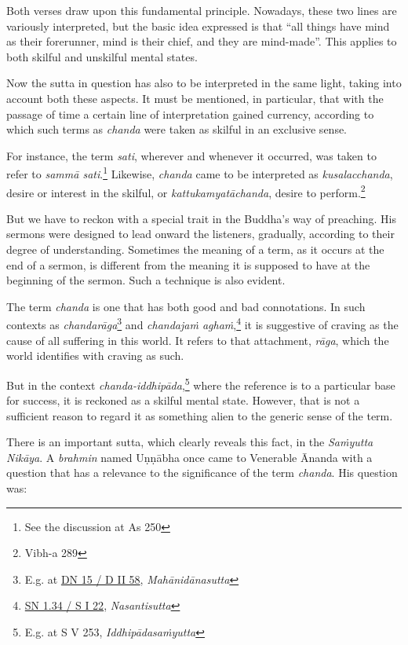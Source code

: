 Both verses draw upon this fundamental principle. Nowadays, these two lines are variously interpreted, but the basic idea expressed is that ``all things have mind as their forerunner, mind is their chief, and they are mind-made''. This applies to both skilful and unskilful mental states.

Now the sutta in question has also to be interpreted in the same light, taking into account both these aspects. It must be mentioned, in particular, that with the passage of time a certain line of interpretation gained currency, according to which such terms as \emph{chanda} were taken as skilful in an exclusive sense.

For instance, the term \emph{sati}, wherever and whenever it occurred, was taken to refer to \emph{sammā sati}.\footnote{See the discussion at As 250} Likewise, \emph{chanda} came to be interpreted as \emph{kusalacchanda}, desire or interest in the skilful, or \emph{kattukamyatāchanda}, desire to perform.\footnote{Vibh-a 289}

But we have to reckon with a special trait in the Buddha's way of preaching. His sermons were designed to lead onward the listeners, gradually, according to their degree of understanding. Sometimes the meaning of a term, as it occurs at the end of a sermon, is different from the meaning it is supposed to have at the beginning of the sermon. Such a technique is also evident.

The term \emph{chanda} is one that has both good and bad connotations. In such contexts as \emph{chandarāga}\footnote{E.g. at \href{https://suttacentral.net/dn15/pli/ms}{DN 15 / D II 58}, \emph{Mahānidānasutta}} and \emph{chandajaṁ aghaṁ},\footnote{\href{https://suttacentral.net/sn1.34/pli/ms}{SN 1.34 / S I 22}, \emph{Nasantisutta}} it is suggestive of craving as the cause of all suffering in this world. It refers to that attachment, \emph{rāga}, which the world identifies with craving as such.

But in the context \emph{chanda-iddhipāda},\footnote{E.g. at S V 253, \emph{Iddhipādasaṁyutta}} where the reference is to a particular base for success, it is reckoned as a skilful mental state. However, that is not a sufficient reason to regard it as something alien to the generic sense of the term.

There is an important sutta, which clearly reveals this fact, in the \emph{Saṁyutta Nikāya}. A \emph{brahmin} named Uṇṇābha once came to Venerable Ānanda with a question that has a relevance to the significance of the term \emph{chanda}. His question was:

